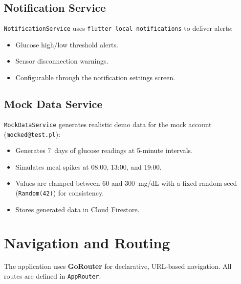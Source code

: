 \documentclass[12pt,a4paper]{article}
\begin{document}
\subsection{Notification Service}

\texttt{NotificationService} uses \texttt{flutter\_local\_notifications} to deliver alerts:
\begin{itemize}
    \item Glucose high/low threshold alerts.
    \item Sensor disconnection warnings.
    \item Configurable through the notification settings screen.
\end{itemize}

\subsection{Mock Data Service}

\texttt{MockDataService} generates realistic demo data for the mock account (\texttt{mocked@test.pl}):
\begin{itemize}
    \item Generates 7~days of glucose readings at 5-minute intervals.
    \item Simulates meal spikes at 08:00, 13:00, and 19:00.
    \item Values are clamped between 60 and 300~mg/dL with a fixed random seed (\texttt{Random(42)}) for consistency.
    \item Stores generated data in Cloud Firestore.
\end{itemize}

\section{Navigation and Routing}

The application uses \textbf{GoRouter} for declarative, URL-based navigation. All routes are defined in \texttt{AppRouter}:
\end{document}
